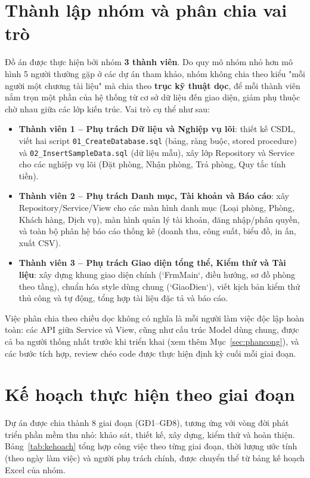 \documentclass[14pt]{report}
\begin{document}
\section{Thành lập nhóm và phân chia vai trò}

Đồ án được thực hiện bởi nhóm \textbf{3 thành viên}. Do quy mô nhóm nhỏ hơn mô hình 5 người thường gặp ở các dự án tham khảo, nhóm không chia theo kiểu "mỗi người một chương tài liệu" mà chia theo \textbf{trục kỹ thuật dọc}, để mỗi thành viên nắm trọn một phần của hệ thống từ cơ sở dữ liệu đến giao diện, giảm phụ thuộc chờ nhau giữa các lớp kiến trúc. Vai trò cụ thể như sau:

\begin{itemize}
  \item \textbf{Thành viên 1 -- Phụ trách Dữ liệu và Nghiệp vụ lõi}: thiết kế CSDL, viết hai script \texttt{01\_CreateDatabase.sql} (bảng, ràng buộc, stored procedure) và \texttt{02\_InsertSampleData.sql} (dữ liệu mẫu), xây lớp Repository và Service cho các nghiệp vụ lõi (Đặt phòng, Nhận phòng, Trả phòng, Quy tắc tính tiền).
  \item \textbf{Thành viên 2 -- Phụ trách Danh mục, Tài khoản và Báo cáo}: xây Repository/Service/View cho các màn hình danh mục (Loại phòng, Phòng, Khách hàng, Dịch vụ), màn hình quản lý tài khoản, đăng nhập/phân quyền, và toàn bộ phân hệ báo cáo thống kê (doanh thu, công suất, biểu đồ, in ấn, xuất CSV).
  \item \textbf{Thành viên 3 -- Phụ trách Giao diện tổng thể, Kiểm thử và Tài liệu}: xây dựng khung giao diện chính (`FrmMain`, điều hướng, sơ đồ phòng theo tầng), chuẩn hóa style dùng chung (`GiaoDien`), viết kịch bản kiểm thử thủ công và tự động, tổng hợp tài liệu đặc tả và báo cáo.
\end{itemize}

Việc phân chia theo chiều dọc không có nghĩa là mỗi người làm việc độc lập hoàn toàn: các API giữa Service và View, cũng như cấu trúc Model dùng chung, được cả ba người thống nhất trước khi triển khai (xem thêm Mục~\ref{sec:phancong}), và các bước tích hợp, review chéo code được thực hiện định kỳ cuối mỗi giai đoạn.

\section{Kế hoạch thực hiện theo giai đoạn}

Dự án được chia thành 8 giai đoạn (GĐ1--GĐ8), tương ứng với vòng đời phát triển phần mềm thu nhỏ: khảo sát, thiết kế, xây dựng, kiểm thử và hoàn thiện. Bảng~\ref{tab:kehoach} tổng hợp công việc theo từng giai đoạn, thời lượng ước tính (theo ngày làm việc) và người phụ trách chính, được chuyển thể từ bảng kế hoạch Excel của nhóm.
\end{document}
